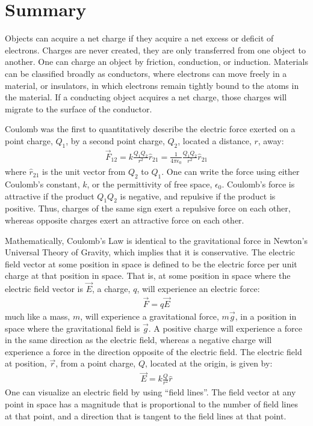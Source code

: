 \section{Summary}
\begin{chapterSummary}
Objects can acquire a net charge if they acquire a net excess or deficit of electrons. Charges are never created, they are only transferred from one object to another. One can charge an object by friction, conduction, or induction. Materials can be classified broadly as conductors, where electrons can move freely in a material, or insulators, in which electrons remain tightly bound to the atoms in the material. If a conducting object acquires a net charge, those charges will migrate to the surface of the conductor.

Coulomb was the first to quantitatively describe the electric force exerted on a point charge, $Q_1$, by a second point charge, $Q_2$, located a distance, $r$, away:
\begin{align*}
\vec F_{12}=k\frac{Q_1Q_2}{r^2}\hat r_{21}=\frac{1}{4\pi\epsilon_0}\frac{Q_1Q_2}{r^2}\hat r_{21}
\end{align*}
where $\hat r_{21}$ is the unit vector from  $Q_2$ to $Q_1$. One can write the force using either Coulomb's constant, $k$, or the permittivity of free space, $\epsilon_0$. Coulomb's force is attractive if the product $Q_1Q_2$ is negative, and repulsive if the product is positive. Thus, charges of the same sign exert a repulsive force on each other, whereas opposite charges exert an attractive force on each other. 

Mathematically, Coulomb's Law is identical to the gravitational force in Newton's Universal Theory of Gravity, which implies that it is conservative. The electric field vector at some position in space is defined to be the electric force per unit charge at that position in space. That is, at some position in space where the electric field vector is $\vec E$, a charge, $q$, will experience an electric force:
\begin{align*}
\vec F=q\vec E
\end{align*} 
much like a mass, $m$, will experience a gravitational force, $m\vec g$, in a position in space where the gravitational field is $\vec g$. A positive charge will experience a force in the same direction as the electric field, whereas a negative charge will experience a force in the direction opposite of the electric field. The electric field at position, $\vec r$, from a point charge, $Q$, located at the origin, is given by:
\begin{align*}
\vec E = k\frac{Q}{r^2}\hat r
\end{align*}
One can visualize an electric field by using ``field lines''. The field vector at any point in space has a magnitude that is proportional to the number of field lines at that point, and a direction that is tangent to the field lines at that point.


\end{chapterSummary}
